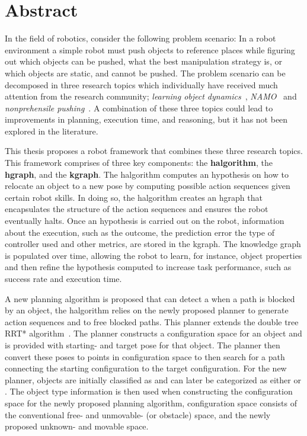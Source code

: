\chapter*{Abstract}
In the field of robotics, consider the following problem scenario: In a robot environment a simple robot must push objects to reference places while figuring out which objects can be pushed, what the best manipulation strategy is, or which objects are static, and cannot be pushed. The problem scenario can be decomposed in three research topics which individually have received much attention from the research community; \textit{learning object dynamics}~\cite{cong_selfadapting_2020,seegmiller_vehicle_2013}, \textit{\acf{NAMO}}~\cite{chen_fast_2018,elbanhawi_samplingbased_2014,kingston_samplingbased_2018,lavalle_planning_2006} and \textit{nonprehensile pushing}~\cite{arruda_uncertainty_2017,bauza_dataefficient_2018,mericli_pushmanipulation_2015,stuber_featurebased_2018,stuber_let_2020,toussaint_sequenceofconstraints_2022}. A combination of these three topics could lead to improvements in planning, execution time, and reasoning, but it has not been explored in the literature.\bs

This thesis proposes a robot framework that combines these three research topics. This framework comprises of three key components: the \textbf{\acl{halgorithm}}, the \textbf{\acl{hgraph}}, and the \textbf{\acl{kgraph}}. The \acl{halgorithm} computes an hypothesis on how to relocate an object to a new pose by computing possible action sequences given certain robot skills. In doing so, the \acl{halgorithm} creates an \acl{hgraph} that encapsulates the structure of the action sequences and ensures the robot eventually halts. Once an hypothesis is carried out on the robot, information about the execution, such as the outcome, the prediction error the type of controller used and other metrics, are stored in the \acl{kgraph}. The knowledge graph is populated over time, allowing the robot to learn, for instance, object properties and then refine the hypothesis computed to increase task performance, such as success rate and execution time.\bs

A new planning algorithm is proposed that can detect a when a path is blocked by an object, the \acl{halgorithm} relies on the newly proposed planner to generate action sequences and to free blocked paths. This planner extends the double tree \acl{RRT*} algorithm~\cite{chen_fast_2018}. The planner constructs a configuration space for an object and is provided with starting- and target pose for that object. The planner then convert these poses to points in configuration space to then search for a path connecting the starting configuration to the target configuration. For the new planner, objects are initially classified as  and can later be categorized as either  or . The object type information is then used when constructing the configuration space for the newly proposed planning algorithm, configuration space consists of the conventional free- and unmovable- (or obstacle) space, and the newly proposed unknown- and movable space.\bs

